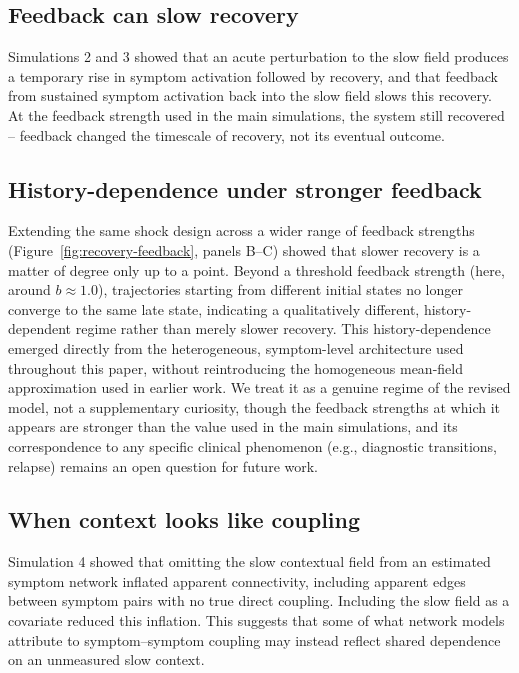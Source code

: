 \subsection{Feedback can slow recovery}
Simulations 2 and 3 showed that an acute perturbation to the slow field
produces a temporary rise in symptom activation followed by recovery, and that
feedback from sustained symptom activation back into the slow field slows this
recovery. At the feedback strength used in the main simulations, the system
still recovered -- feedback changed the timescale of recovery, not its
eventual outcome.

\subsection{History-dependence under stronger feedback}
Extending the same shock design across a wider range of feedback strengths
(Figure~\ref{fig:recovery-feedback}, panels B--C) showed that slower recovery
is a matter of degree only up to a point. Beyond a threshold feedback
strength (here, around \(b\approx1.0\)), trajectories starting from different
initial states no longer converge to the same late state, indicating a
qualitatively different, history-dependent regime rather than merely slower
recovery. This history-dependence emerged directly from the heterogeneous,
symptom-level architecture used throughout this paper, without reintroducing
the homogeneous mean-field approximation used in earlier work. We treat it as
a genuine regime of the revised model, not a supplementary curiosity, though
the feedback strengths at which it appears are stronger than the value used in
the main simulations, and its correspondence to any specific clinical
phenomenon (e.g., diagnostic transitions, relapse) remains an open question
for future work.

\subsection{When context looks like coupling}
Simulation 4 showed that omitting the slow contextual field from an estimated
symptom network inflated apparent connectivity, including apparent edges
between symptom pairs with no true direct coupling. Including the slow field
as a covariate reduced this inflation. This suggests that some of what
network models attribute to symptom--symptom coupling may instead reflect
shared dependence on an unmeasured slow context.

